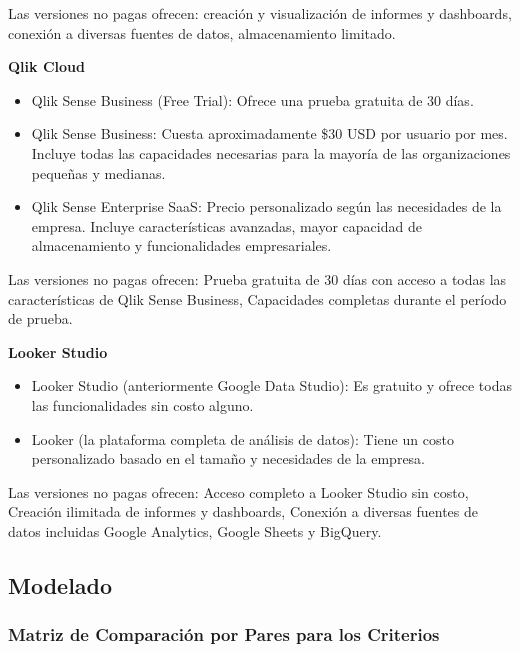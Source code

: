 \documentclass[
  11pt,
  bookmarksnumbered]{article}
\begin{document}
Las versiones no pagas ofrecen: creación y visualización de informes y dashboards, conexión a diversas fuentes de datos, almacenamiento limitado.

\textbf{Qlik Cloud}

\begin{itemize}
\item
  Qlik Sense Business (Free Trial): Ofrece una prueba gratuita de 30 días.
\item
  Qlik Sense Business: Cuesta aproximadamente \$30 USD por usuario por mes. Incluye todas las capacidades necesarias para la mayoría de las organizaciones pequeñas y medianas.
\item
  Qlik Sense Enterprise SaaS: Precio personalizado según las necesidades de la empresa. Incluye características avanzadas, mayor capacidad de almacenamiento y funcionalidades empresariales.
\end{itemize}

Las versiones no pagas ofrecen: Prueba gratuita de 30 días con acceso a todas las características de Qlik Sense Business, Capacidades completas durante el período de prueba.

\textbf{Looker Studio}

\begin{itemize}
\item
  Looker Studio (anteriormente Google Data Studio): Es gratuito y ofrece todas las funcionalidades sin costo alguno.
\item
  Looker (la plataforma completa de análisis de datos): Tiene un costo personalizado basado en el tamaño y necesidades de la empresa.
\end{itemize}

Las versiones no pagas ofrecen: Acceso completo a Looker Studio sin costo, Creación ilimitada de informes y dashboards, Conexión a diversas fuentes de datos incluidas Google Analytics, Google Sheets y BigQuery.

\newpage

\hypertarget{modelado-1}{%
\subsection{Modelado}\label{modelado-1}}

\hypertarget{matriz-de-comparaciuxf3n-por-pares-para-los-criterios}{%
\subsubsection{Matriz de Comparación por Pares para los Criterios}\label{matriz-de-comparaciuxf3n-por-pares-para-los-criterios}}
\end{document}

